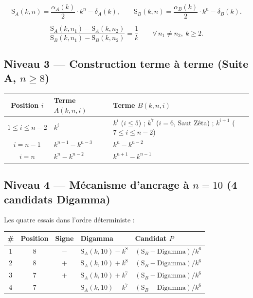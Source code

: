 \documentclass[11pt,a4paper]{article}
\newcommand{\SA}{\mathrm{S}_A}
\newcommand{\SB}{\mathrm{S}_B}
\begin{document}
\begin{boitenote}
\begin{boitenote}[Inspiration]
\begin{boitenote}
\vspace{0.3cm}
\begin{boiteformule}
\[
\SA(k,n) = \frac{\alpha_A(k)}{2}\cdot k^{n} - \delta_A(k),
\qquad
\SB(k,n) = \frac{\alpha_B(k)}{2}\cdot k^{n} - \delta_B(k).
\]
\end{boiteformule}

\vspace{0.3cm}
\begin{boitenote}
\[
\frac{\SA(k,n_1) - \SA(k,n_2)}{\SB(k,n_1) - \SB(k,n_2)} = \frac{1}{k}
\qquad \forall\, n_1 \neq n_2,\ k \ge 2.
\]


\subsection{Niveau 3 --- Construction terme à terme (Suite A, $n \ge 8$)}

\begin{center}
\small
\begin{tabular}{@{}c l l@{}}
\toprule
\rowcolor{spectralgris}
Position $i$ & Terme $A(k,n,i)$ & Terme $B(k,n,i)$ \\
\midrule
$1 \le i \le n-2$ & $k^{i}$ & $k^{i}$ ($i \le 5$) ; $k^{7}$ ($i=6$, Saut Zêta) ; $k^{i+1}$ ($7 \le i \le n-2$) \\
$i = n-1$ & $k^{n-1} - k^{n-3}$ & $k^{n} - k^{n-2}$ \\
$i = n$ & $k^{n} - k^{n-2}$ & $k^{n+1} - k^{n-1}$ \\
\bottomrule
\end{tabular}
\end{center}

\subsection{Niveau 4 --- Mécanisme d'ancrage à $n = 10$ (4 candidats Digamma)}

Les quatre essais dans l'ordre déterministe :

\begin{center}
\small
\begin{tabular}{@{}c c c l l@{}}
\toprule
\rowcolor{spectralgris}
\# & Position & Signe & Digamma & Candidat $P$ \\
\midrule
1 & 8 & $-$ & $\SA(k,10) - k^{8}$ & $(\SB - \text{Digamma})/k^{6}$ \\
2 & 8 & $+$ & $\SA(k,10) + k^{8}$ & $(\SB - \text{Digamma})/k^{6}$ \\
3 & 7 & $+$ & $\SA(k,10) + k^{7}$ & $(\SB - \text{Digamma})/k^{6}$ \\
4 & 7 & $-$ & $\SA(k,10) - k^{7}$ & $(\SB - \text{Digamma})/k^{6}$ \\
\bottomrule
\end{tabular}
\end{center}


\end{boitenote}
\end{boitenote}
\end{boitenote}
\end{boitenote}
\end{document}
